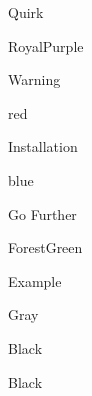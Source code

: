 \usepackage{tcolorbox}

\newcommand{\defprop}[3]{
  \expandafter\def\csname @val@#1@#2\endcsname{#3}
}

\newcommand{\getprop}[2]{%
  \ifcsname @val@#1@#2\endcsname%
  \csname @val@#1@#2\endcsname%
  \fi
}

\newcommand{\defbox}[3]{
  \defprop{#1}{title}{#2}
  \defprop{#1}{color}{#3}
}

\defbox{quirk}{Quirk}{RoyalPurple}
\defbox{warning}{Warning}{red}
\defbox{installation}{Installation}{blue}
\defbox{further}{Go Further}{ForestGreen}
\defbox{example}{Example}{Gray}
\defbox{notcode}{}{Black}
\defbox{author-picture}{}{Black}

\newenvironment{bookblock}[1]{
  \ifcsname @val@#1@color\endcsname
  \begin{tcolorbox}[colback=\getprop{#1}{color}!5!white,
                    colframe=\getprop{#1}{color}!75!white,
                    title={\getprop{#1}{title}}]
  \else
  \PackageError{bookblock}{Unknown book block '#1'}{}
  \fi
}{
\end{tcolorbox}
}

\newenvironment{bookblock*}[1]{
  \ifcsname @val@#1@color\endcsname
  \begin{tcolorbox}[colback=\getprop{#1}{color}!5!white,
                    colframe=\getprop{#1}{color}!75!white]
  \else
  \PackageError{bookblock}{Unknown book block '#1'}{}
  \fi
}{
\end{tcolorbox}
}

